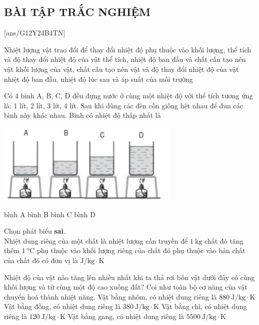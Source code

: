 \subsection{BÀI TẬP TRẮC NGHIỆM}
\setcounter{ex}{0}
[ans/G12Y24B4TN]
\begin{ex}
	Nhiệt lượng vật trao đổi để thay đổi nhiệt độ phụ thuộc vào
	\choice
	{khối lượng, thể tích và độ thay đổi nhiệt độ của vật}
	{ thể tích, nhiệt độ ban đầu và chất cấu tạo nên vật}
	{\True  khối lượng của vật, chất cấu tạo nên vật và độ thay đổi nhiệt độ của vật}
	{nhiệt độ ban đầu, nhiệt độ lúc sau và áp suất của môi trường}
	\loigiai{ }
	\end{ex}
\begin{ex}
	Có 4 bình A, B, C, D đều đựng nước ở cùng một nhiệt độ với thể tích tương ứng là: 1 lít, 2 lít, 3 lít, 4 lít. Sau
	khi dùng các đèn cồn giống hệt nhau để đun các bình này khác nhau. Bình có nhiệt độ thấp nhất là
	\begin{center}
		\includegraphics[width=0.4\linewidth]{figs/VN12-Y24-PH-SYL-004P-1}
	\end{center}
	\choice
	{bình A}
	{bình B}
	{bình C}
	{\True bình D}
	\loigiai{}
\end{ex}
\begin{ex}
	Chọn phát biểu \textbf{sai}.\\
	Nhiệt dung riêng của một chất 
	\choice
	{là nhiệt lượng cần truyền để $\SI{1}{\kilogram}$ chất đó tăng thêm $\SI{1}{\celsius}$}
	{\True phụ thuộc vào khối lượng riêng của chất đó}
	{phụ thuộc vào bản chất của chất đó}
	{có đơn vị là $\si{\joule/\kilogram\cdot\kelvin}$}
	\loigiai{}
\end{ex}
\begin{ex}
Nhiệt độ của vật nào tăng lên nhiều nhất khi ta thả rơi bốn vật dưới đây có cùng khối lượng và từ cùng một độ cao xuống đất? Coi như toàn bộ cơ năng của vật chuyển hoá thành nhiệt năng.
	\choice
	{Vật bằng nhôm, có nhiệt dung riêng là $\SI{880}{\joule/\kilogram\cdot\kelvin}$}
	{Vật bằng đồng, có nhiệt dung riêng là $\SI{380}{\joule/\kilogram\cdot\kelvin}$}
	{\True Vật bằng chì, có nhiệt dung riêng là $\SI{120}{\joule/\kilogram\cdot\kelvin}$}
	{Vật bằng gang, có nhiệt dung riêng là $\SI{5500}{\joule/\kilogram\cdot\kelvin}$}
\end{ex}
